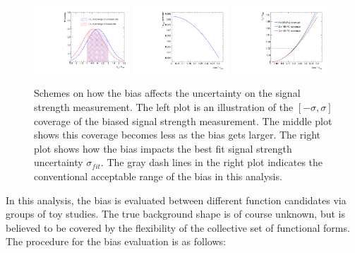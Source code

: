 \begin{figure}[!htb]
  \centering
  \captionsetup{justification=justified}
  \includegraphics[width=0.32\textwidth]{pics/VH_sec/bias_derivation/coverage_scheme.pdf}
  \includegraphics[width=0.32\textwidth]{pics/VH_sec/bias_derivation/coverage_1sigma.pdf}
  \includegraphics[width=0.32\textwidth]{pics/VH_sec/bias_derivation/sigma_fit.pdf}
  \caption{Schemes on how the bias affects the uncertainty on the signal strength measurement.
           The left plot is an illustration of the $[-\sigma, \sigma]$ coverage of the biased signal strength measurement.
           The middle plot shows this coverage becomes less as the bias gets larger.
           The right plot shows how the bias impacts the best fit signal strength uncertainty $\sigma_{fit}$.
           The gray dash lines in the right plot indicates the conventional acceptable range of the bias in this analysis.}
  \label{fig:bias_derivation}
\end{figure}

In this analysis, the bias is evaluated between different function candidates via groups of toy studies.
The true background shape is of course unknown, but is believed to be covered by the flexibility of the collective set of functional forms.
The procedure for the bias evaluation is as follows:

